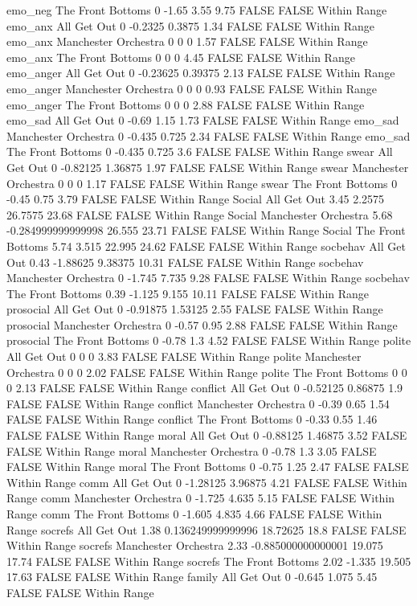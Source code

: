 emo_neg The Front Bottoms 0 -1.65 3.55 9.75 FALSE FALSE Within Range
emo_anx All Get Out 0 -0.2325 0.3875 1.34 FALSE FALSE Within Range
emo_anx Manchester Orchestra 0 0 0 1.57 FALSE FALSE Within Range
emo_anx The Front Bottoms 0 0 0 4.45 FALSE FALSE Within Range
emo_anger All Get Out 0 -0.23625 0.39375 2.13 FALSE FALSE Within Range
emo_anger Manchester Orchestra 0 0 0 0.93 FALSE FALSE Within Range
emo_anger The Front Bottoms 0 0 0 2.88 FALSE FALSE Within Range
emo_sad All Get Out 0 -0.69 1.15 1.73 FALSE FALSE Within Range
emo_sad Manchester Orchestra 0 -0.435 0.725 2.34 FALSE FALSE Within Range
emo_sad The Front Bottoms 0 -0.435 0.725 3.6 FALSE FALSE Within Range
swear All Get Out 0 -0.82125 1.36875 1.97 FALSE FALSE Within Range
swear Manchester Orchestra 0 0 0 1.17 FALSE FALSE Within Range
swear The Front Bottoms 0 -0.45 0.75 3.79 FALSE FALSE Within Range
Social All Get Out 3.45 2.2575 26.7575 23.68 FALSE FALSE Within Range
Social Manchester Orchestra 5.68 -0.284999999999998 26.555 23.71 FALSE FALSE Within Range
Social The Front Bottoms 5.74 3.515 22.995 24.62 FALSE FALSE Within Range
socbehav All Get Out 0.43 -1.88625 9.38375 10.31 FALSE FALSE Within Range
socbehav Manchester Orchestra 0 -1.745 7.735 9.28 FALSE FALSE Within Range
socbehav The Front Bottoms 0.39 -1.125 9.155 10.11 FALSE FALSE Within Range
prosocial All Get Out 0 -0.91875 1.53125 2.55 FALSE FALSE Within Range
prosocial Manchester Orchestra 0 -0.57 0.95 2.88 FALSE FALSE Within Range
prosocial The Front Bottoms 0 -0.78 1.3 4.52 FALSE FALSE Within Range
polite All Get Out 0 0 0 3.83 FALSE FALSE Within Range
polite Manchester Orchestra 0 0 0 2.02 FALSE FALSE Within Range
polite The Front Bottoms 0 0 0 2.13 FALSE FALSE Within Range
conflict All Get Out 0 -0.52125 0.86875 1.9 FALSE FALSE Within Range
conflict Manchester Orchestra 0 -0.39 0.65 1.54 FALSE FALSE Within Range
conflict The Front Bottoms 0 -0.33 0.55 1.46 FALSE FALSE Within Range
moral All Get Out 0 -0.88125 1.46875 3.52 FALSE FALSE Within Range
moral Manchester Orchestra 0 -0.78 1.3 3.05 FALSE FALSE Within Range
moral The Front Bottoms 0 -0.75 1.25 2.47 FALSE FALSE Within Range
comm All Get Out 0 -1.28125 3.96875 4.21 FALSE FALSE Within Range
comm Manchester Orchestra 0 -1.725 4.635 5.15 FALSE FALSE Within Range
comm The Front Bottoms 0 -1.605 4.835 4.66 FALSE FALSE Within Range
socrefs All Get Out 1.38 0.136249999999996 18.72625 18.8 FALSE FALSE Within Range
socrefs Manchester Orchestra 2.33 -0.885000000000001 19.075 17.74 FALSE FALSE Within Range
socrefs The Front Bottoms 2.02 -1.335 19.505 17.63 FALSE FALSE Within Range
family All Get Out 0 -0.645 1.075 5.45 FALSE FALSE Within Range
